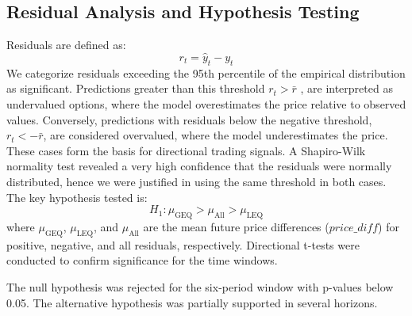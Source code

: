 \documentclass{article}
\begin{document}
\subsection{Residual Analysis and Hypothesis Testing}

Residuals are defined as:
\[
r_t = \hat{y}_t - y_t
\]
We categorize residuals exceeding the 95th percentile of the empirical distribution as significant. Predictions greater than this threshold $r_t > \bar{r}$ , are interpreted as undervalued options, where the model overestimates the price relative to observed values. Conversely, predictions with residuals below the negative threshold, $r_t < -\bar{r}$, are considered overvalued, where the model underestimates the price. These cases form the basis for directional trading signals. A Shapiro-Wilk normality test revealed a very high confidence that the residuals were normally distributed, hence we were justified in using the same threshold in both cases.
The key hypothesis tested is:
\[
H_1: \mu_{\text{GEQ}} > \mu_{\text{All}} > \mu_{\text{LEQ}}
\]
where \( \mu_{\text{GEQ}} \), \( \mu_{\text{LEQ}} \), and \( \mu_{\text{All}} \) are the mean future price differences ($price\_diff$) for positive, negative, and all residuals, respectively. Directional t-tests were conducted to confirm significance for the time windows.

The null hypothesis was rejected for the six-period window with p-values below 0.05. The alternative hypothesis was partially supported in several horizons.

\begin{table}[h]
  \centering
  \caption{Mean future price ratios by residual group and associated $p$-values. * indicates significance at $p = 0.05$.}
  \label{tab:mean-return}
\end{table}
\end{document}
